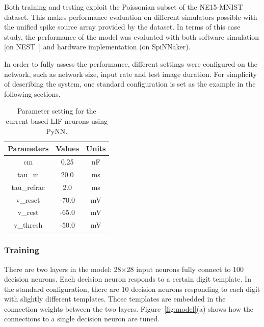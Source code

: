 \documentclass{frontiersENG} %
\begin{document}
Both training and testing exploit the Poissonian subset of the NE15-MNIST dataset.
This makes performance evaluation on different simulators possible with the unified spike source array provided by the dataset. 
In terms of this case study, the performance of the model was evaluated with both software simulation [on NEST~\citep{gewaltig2007nest}] and hardware implementation (on SpiNNaker).

In order to fully assess the performance, different settings were configured on the network, such as network size, input rate and test image duration.
For simplicity of describing the system, one standard configuration is set as the example in the following sections.

\begin{table}[hbbp]
	\centering
	\caption{\label{tbl:pynnSetting}Parameter setting for the current-based LIF neurons using PyNN.}
	\bgroup
	\def\arraystretch{1.4}
	\begin{tabular}{c c c}
		Parameters & Values & Units \\
		\hline
		cm & 0.25 & nF	\\
		tau\_m & 20.0 & ms\\
		tau\_refrac & 2.0 & ms\\
		v\_reset & -70.0 & mV\\
		v\_rest & -65.0 & mV\\
		v\_thresh & -50.0 & mV\\
	\end{tabular}
	\egroup
\end{table}

\subsubsection{Training}
There are two layers in the model: 28$\times$28 input neurons fully connect to 100 decision neurons.
Each decision neuron responds to a certain digit template.
In the standard configuration, there are 10 decision neurons responding to each digit with slightly different templates.
Those templates are embedded in the connection weights between the two layers.
Figure~\ref{fig:model}(a) shows how the connections to a single decision neuron are tuned.
\end{document}
